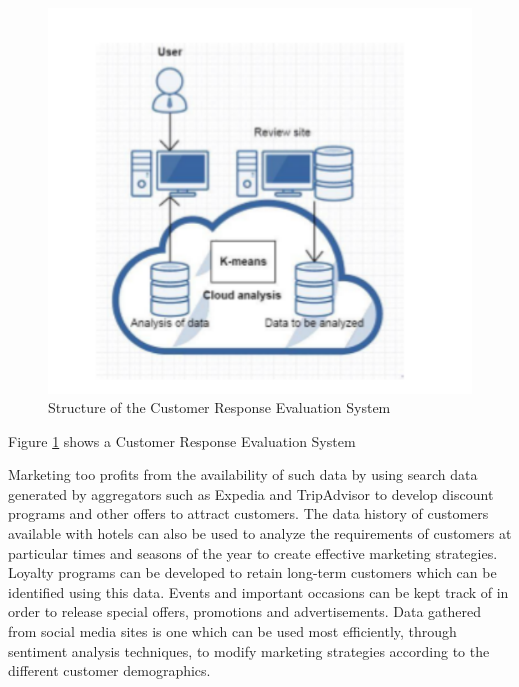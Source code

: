 \documentclass[sigconf]{acmart}
\begin{document}
\begin{figure}
	\includegraphics[width=\columnwidth]{images/evaluation_system.pdf}
	\caption{Structure of the Customer Response Evaluation System \cite {jianfangwang07}}
        \label{F:Figure2}
\end{figure}
Figure \ref{F:Figure2} shows a Customer Response Evaluation System

Marketing too profits from the availability of such data by using search data generated by aggregators such as Expedia and TripAdvisor to develop discount programs and other offers to attract customers. The data history of customers available with hotels can also be used to analyze the requirements of customers at particular times and seasons of the year to create effective marketing strategies. Loyalty programs can be developed to retain long-term customers which can be identified using this data. Events and important occasions can be kept track of in order to release special offers, promotions and advertisements. Data gathered from social media sites is one which can be used most efficiently, through sentiment analysis techniques, to modify marketing strategies according to the different customer demographics.
\end{document}
